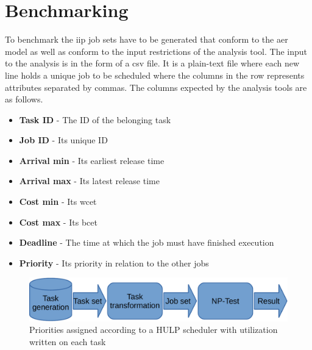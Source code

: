 \documentclass{kththesis}
\begin{document}
\section{Benchmarking}\label{sec:benchmarking}

To benchmark the \acrshort{iip} job sets have to be generated that conform to
the \acrshort{aer} model as well as conform to the input restrictions of the
analysis tool. The input to the analysis is in the form of a \acrfull{csv}
file. It is a plain-text file where each new line holds a unique job to be
scheduled where the columns in the row represents attributes separated by
commas. The columns expected by the analysis tools are as follows.

\begin{itemize}
    \item \textbf{Task ID} - The ID of the belonging task
    \item \textbf{Job ID} - Its unique ID
    \item \textbf{Arrival min} - Its earliest release time
    \item \textbf{Arrival max} - Its latest release time
    \item \textbf{Cost min} - Its \acrshort{wcet}
    \item \textbf{Cost max} - Its \acrshort{bcet}
    \item \textbf{Deadline} - The time at which the job must have finished execution
    \item \textbf{Priority} - Its priority in relation to the other jobs
\end{itemize}


\begin{figure}

    \centering

    \includegraphics[width=0.8\linewidth]{images/benchmark_toolchain.pdf}

    \caption{Priorities assigned according to a HULP scheduler with utilization written on each task}

    \label{fig:benchmark_toolchain}

\end{figure}
\end{document}
